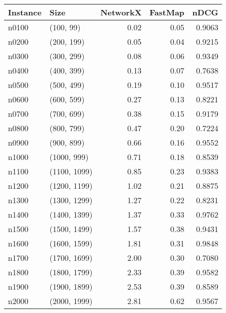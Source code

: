 \begin{tabular}{llrrr}
\toprule
Instance &         Size &  NetworkX &  FastMap &   nDCG \\
\midrule
   n0100 &    (100, 99) &      0.02 &     0.05 & 0.9063 \\
   n0200 &   (200, 199) &      0.05 &     0.04 & 0.9215 \\
   n0300 &   (300, 299) &      0.08 &     0.06 & 0.9349 \\
   n0400 &   (400, 399) &      0.13 &     0.07 & 0.7638 \\
   n0500 &   (500, 499) &      0.19 &     0.10 & 0.9517 \\
   n0600 &   (600, 599) &      0.27 &     0.13 & 0.8221 \\
   n0700 &   (700, 699) &      0.38 &     0.15 & 0.9179 \\
   n0800 &   (800, 799) &      0.47 &     0.20 & 0.7224 \\
   n0900 &   (900, 899) &      0.66 &     0.16 & 0.9552 \\
   n1000 &  (1000, 999) &      0.71 &     0.18 & 0.8539 \\
   n1100 & (1100, 1099) &      0.85 &     0.23 & 0.9383 \\
   n1200 & (1200, 1199) &      1.02 &     0.21 & 0.8875 \\
   n1300 & (1300, 1299) &      1.27 &     0.22 & 0.8231 \\
   n1400 & (1400, 1399) &      1.37 &     0.33 & 0.9762 \\
   n1500 & (1500, 1499) &      1.57 &     0.38 & 0.9431 \\
   n1600 & (1600, 1599) &      1.81 &     0.31 & 0.9848 \\
   n1700 & (1700, 1699) &      2.00 &     0.30 & 0.7080 \\
   n1800 & (1800, 1799) &      2.33 &     0.39 & 0.9582 \\
   n1900 & (1900, 1899) &      2.53 &     0.39 & 0.8589 \\
   n2000 & (2000, 1999) &      2.81 &     0.62 & 0.9567 \\
\bottomrule
\end{tabular}
